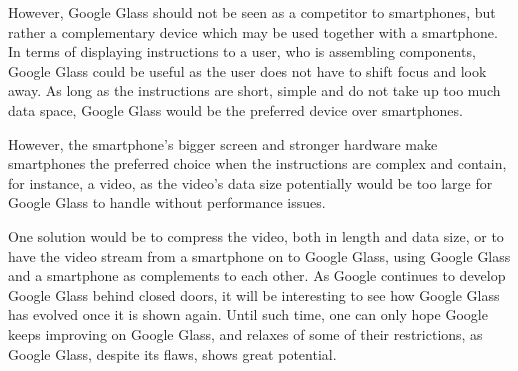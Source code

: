 However, Google Glass should not be seen as a competitor to smartphones, but rather a complementary device which may be used together with a smartphone. In terms of displaying instructions to a user, who is assembling components, Google Glass could be useful as the user does not have to shift focus and look away. As long as the instructions are short, simple and do not take up too much data space, Google Glass would be the preferred device over smartphones.

However, the smartphone's bigger screen and stronger hardware make smartphones the preferred choice when the instructions are complex and contain, for instance, a video, as the video's data size potentially would be too large for Google Glass to handle without performance issues.

One solution would be to compress the video, both in length and data size, or to have the video stream from a smartphone on to Google Glass, using Google Glass and a smartphone as complements to each other. As Google continues to develop Google Glass behind closed doors, it will be interesting to see how Google Glass has evolved once it is shown again. Until such time, one can only hope Google keeps improving on Google Glass, and relaxes of some of their restrictions, as Google Glass, despite its flaws, shows great potential.